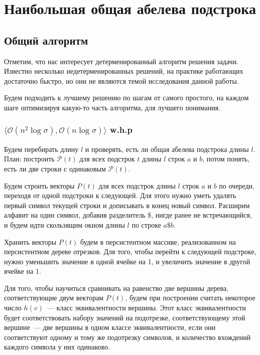 \section{Наибольшая общая абелева подстрока}

\subsection{Общий алгоритм}

Отметим, что нас интересует детерменированный алгоритм решения задачи. Известно несколько недетерменированных решений, на практике работающих достаточно быстро, но они не являются темой исследования данной работы.

Будем подходить к лучшему решению по шагам от самого простого, на каждом шаге оптимизируя какую-то часть алгоритма, для лучшего понимания.

\subsubsection{$\langle \mathcal{O}(n^2 \log \sigma), \mathcal{O}(n \log \sigma) \rangle$ w.h.p}

Будем перебирать длину $l$ и проверять, есть ли общая абелева подстрока длины $l$.
План: построить $\mathcal{P}(t)$ для всех подстрок $t$ длины $l$ строк $a$ и $b$, потом понять, есть ли две строки с одинаковым $\mathcal{P}(t)$.

Будем строить векторы $P(t)$ для всех подстрок длины $l$ строк $a$ и $b$ по очереди, переходя от одной подстроки к следующей. Для этого нужно уметь удалять первый символ текущей строки и дописывать в конец новый символ. Расширим алфавит на один символ, добавив разделитель $\$$, нигде ранее не встречающийся, и будем идти скользящим окном длины $l$ по строке $a\$b$.

Хранить векторы $P(t)$ будем в персистентном массиве, реализованном на персистентном дереве отрезков. Для того, чтобы перейти к следующей подстроке, нужно уменьшить значение в одной ячейке на 1, и увеличить значение в другой ячейке на 1.

Для того, чтобы научиться сравнивать на равенство две вершины дерева, соответствующие двум векторам $P(t)$, будем при построении считать некоторое число $h(v)$~--- класс эквивалентности вершины. Этот класс эквивалентности будет соответствовать набору значений на подотрезке, соответствующему этой вершине~--- две вершины в одном классе эквивалентности, если они соответствуют одному и тому же подотрезку символов, и количество вхождений каждого символа у них одинаково.

